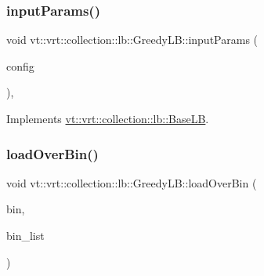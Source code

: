 \subsubsection{\texorpdfstring{input\+Params()}{inputParams()}}
{\footnotesize\ttfamily void vt\+::vrt\+::collection\+::lb\+::\+Greedy\+L\+B\+::input\+Params (\begin{DoxyParamCaption}\item[{\hyperlink{structvt_1_1vrt_1_1collection_1_1balance_1_1_config_entry}{balance\+::\+Config\+Entry} $\ast$}]{config }\end{DoxyParamCaption})\hspace{0.3cm}{\ttfamily [override]}, {\ttfamily [virtual]}}



Implements \hyperlink{structvt_1_1vrt_1_1collection_1_1lb_1_1_base_l_b_acf56a0cc29f5e00c0dccf2003baa2f43}{vt\+::vrt\+::collection\+::lb\+::\+Base\+LB}.

\mbox{\label{structvt_1_1vrt_1_1collection_1_1lb_1_1_greedy_l_b_a2eebe9945964c405c237ae025d901c93}} 
\subsubsection{\texorpdfstring{load\+Over\+Bin()}{loadOverBin()}}
{\footnotesize\ttfamily void vt\+::vrt\+::collection\+::lb\+::\+Greedy\+L\+B\+::load\+Over\+Bin (\begin{DoxyParamCaption}\item[{\hyperlink{structvt_1_1vrt_1_1collection_1_1lb_1_1_load_sampler_base_l_b_acb55af31b27a3c248d351189abd78487}{Obj\+Bin\+Type}}]{bin,  }\item[{\hyperlink{structvt_1_1vrt_1_1collection_1_1lb_1_1_load_sampler_base_l_b_a58de8f1e1204cf52b661b3906e2d9eeb}{Obj\+Bin\+List\+Type} \&}]{bin\+\_\+list }\end{DoxyParamCaption})\hspace{0.3cm}{\ttfamily [private]}}

\mbox{\label{structvt_1_1vrt_1_1collection_1_1lb_1_1_greedy_l_b_a1d746659b257bc6897976b23deda3f2e}} 
